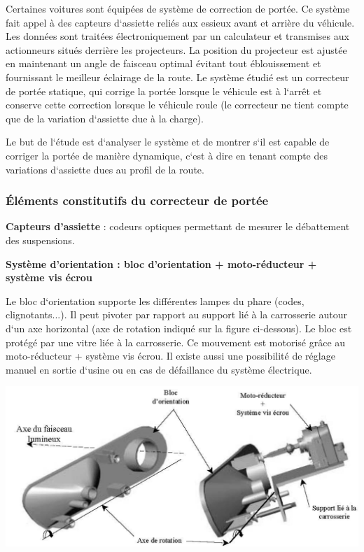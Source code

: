 \documentclass[11pt,oneside]{article}
\begin{document}
         Certaines voitures sont équipées de système de correction de portée. Ce
système fait appel à
des capteurs d‘assiette reliés aux essieux avant et arrière du véhicule. Les
données sont traitées
électroniquement par un calculateur et transmises aux actionneurs situés
derrière les projecteurs. La
position du projecteur est ajustée en maintenant un angle de faisceau optimal
évitant tout
éblouissement et fournissant le meilleur éclairage de la route.
Le système étudié est un correcteur de portée statique, qui corrige la portée
lorsque le véhicule est à
l‘arrêt et conserve cette correction lorsque le véhicule roule (le correcteur ne
tient compte que de la
variation d‘assiette due à la charge).

       Le but de l‘étude est d‘analyser le système et de montrer s‘il est
capable de corriger la portée
de manière dynamique, c‘est à dire en tenant compte des variations d‘assiette
dues au profil de la
route.

\subsubsection*{Éléments constitutifs du correcteur de portée}

\textbf{Capteurs d’assiette} : codeurs optiques permettant de mesurer le
débattement des suspensions.

\textbf{Système d’orientation : bloc d’orientation + moto-réducteur + système
vis écrou}

Le bloc d‘orientation supporte les différentes lampes du phare (codes,
clignotants...). Il peut pivoter
par rapport au support lié à la carrosserie autour d‘un axe horizontal (axe de
rotation indiqué sur la
figure ci-dessous). Le bloc est protégé par une vitre liée à la carrosserie. Ce
mouvement est motorisé
grâce au moto-réducteur + système vis écrou. Il existe aussi une possibilité de
réglage manuel en
sortie d‘usine ou en cas de défaillance du système électrique.

\begin{center}
 \includegraphics[width=.6\textwidth]{png/image2}
\end{center}
\end{document}
